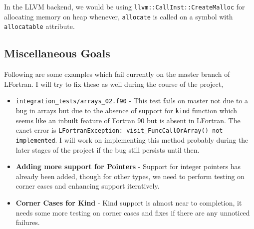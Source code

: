 In the LLVM backend, we would be using \texttt{llvm::CallInst::CreateMalloc} for allocating memory on heap whenever, \texttt{allocate} is called on a symbol with \texttt{allocatable} attribute.



\subsection{Miscellaneous Goals}

Following are some examples which fail currently on the master branch of LFortran. I will try to fix these as well during the course of the project,

\begin{itemize}

\item \texttt{integration\_tests/arrays\_02.f90} - This test fails on master not due to a bug in arrays but due to the absence of support for \texttt{kind} function which seems like an inbuilt feature of Fortran 90 but is absent in LFortran. The exact error is \texttt{LFortranException: visit\_FuncCallOrArray() not implemented}. I will work on implementing this method probably during the later stages of the project if the bug still persists until then.

\item \textbf{Adding more support for Pointers} - Support for integer pointers has already been added, though for other types, we need to perform testing on corner cases and enhancing support iteratively.

\item \textbf{Corner Cases for Kind} - Kind support is almost near to completion, it needs some more testing on corner cases and fixes if there are any unnoticed failures.

\end{itemize}